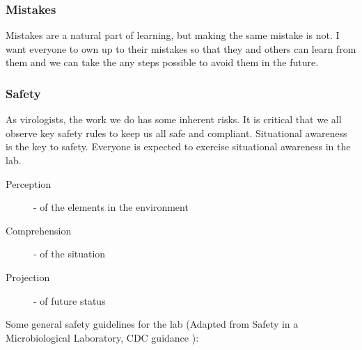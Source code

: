 \documentclass[10pt, a4paper, twocolumn]{article} %
\begin{document}
\subsubsection{Mistakes}
Mistakes are a natural part of learning, but making the same mistake is not. I want everyone to own up to their mistakes so that they and others can learn from them and we can take the any steps possible to avoid them in the future. 
\subsubsection{Safety}
As virologists, the work we do has some inherent risks. It is critical that we all observe key safety rules to keep us all safe and compliant.\newline
Situational awareness is the key to safety. Everyone is expected to exercise situational awareness in the lab.
\begin{description}
\item [Perception] - of the elements in the environment
\item [Comprehension] - of the situation
\item [Projection] - of future status
\end{description}
Some general safety guidelines for the lab (Adapted from Safety in a Microbiological Laboratory, CDC guidance \citep{US_Department_of_Health_and_Human_Services2020-ck}):
\end{document}

